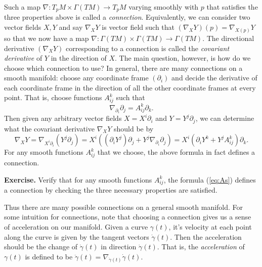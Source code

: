 \documentclass[
]{article}
\begin{document}
Such a map \(\nabla: T_pM \times \Gamma(TM) \to T_pM\) varying smoothly
with \(p\) that satisfies the three properties above is called a
\emph{connection}. Equivalently, we can consider two vector fields
\(X,Y\) and say \(\nabla_X Y\) is vector field such that
\((\nabla_X Y)(p) = \nabla_{X(p)} Y\) so that we now have a map
\(\nabla: \Gamma(TM) \times \Gamma(TM) \to \Gamma(TM)\). The directional
derivative \((\nabla_X Y)\) corresponding to a connection is called the
\emph{covariant derivative} of \(Y\) in the direction of \(X\). The main
question, however, is how do we choose which connection to use? In
general, there are many connections on a smooth manifold: choose any
coordinate frame \((\partial_i)\) and decide the derivative of each
coordinate frame in the direction of all the other coordinate frames at
every point. That is, choose functions \(A_{ij}^k\) such that \[
    \nabla_{\partial_i}\partial_j = A_{ij}^k \partial_k.
\] Then given any arbitrary vector fields \(X = X^i\partial_i\) and
\(Y = Y^j\partial_j\), we can determine what the covariant derivative
\(\nabla_XY\) should be by \[
    \nabla_X Y 
    = \nabla_{X^i \partial_i}(Y^j \partial_j)
    = X^i((\partial_iY^j)\partial_j + Y^j \nabla_{\partial_i}\partial_j)
    = X^i(\partial_iY^k + Y^jA_{ij}^k)\partial_k.
    \label{eq:As}
    \tag{A}
\] For any smooth functions \(A_{ij}^k\) that we choose, the above
formula in fact defines a connection.

\textbf{Exercise.} Verify that for any smooth functions \(A_{ij}^k\),
the formula (\ref{eq:As}) defines a connection by checking the three
necessary properties are satisfied.

Thus there are many possible connections on a general smooth manifold.
For some intuition for connections, note that choosing a connection
gives us a sense of acceleration on our manifold. Given a curve
\(\gamma(t)\), it's velocity at each point along the curve is given by
the tangent vectors \(\dot{\gamma}(t)\). Then the acceleration should be
the change of \(\dot{\gamma}(t)\) in direction \(\dot{\gamma}(t)\). That
is, the \emph{acceleration} of \(\gamma(t)\) is defined to be
\(\ddot{\gamma}(t) = \nabla_{\dot{\gamma}(t)}\dot{\gamma}(t)\).
\end{document}
